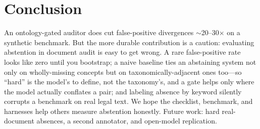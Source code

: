 \documentclass[11pt]{article}
\begin{document}
\section{Conclusion}
An ontology-gated auditor does cut false-positive divergences $\sim$20--30$\times$
on a synthetic benchmark. But the more durable contribution is a caution:
evaluating abstention in document audit is easy to get wrong. A rare
false-positive rate looks like zero until you bootstrap; a naive baseline ties an
abstaining system not only on wholly-missing concepts but on taxonomically-adjacent
ones too---so ``hard'' is the model's to define, not the taxonomy's, and a gate
helps only where the model actually conflates a pair; and labeling absence by
keyword silently corrupts a benchmark on real legal text. We hope the checklist, benchmark, and
harnesses help others measure abstention honestly. Future work: hard
real-document absences, a second annotator, and open-model replication.
\end{document}

